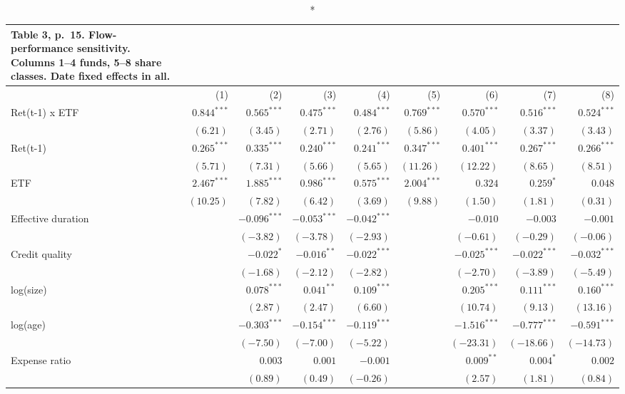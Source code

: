 \documentclass[10pt,a4paper]{article}
\begin{document}
{\scriptsize\setlength{\tabcolsep}{4pt}
\begin{longtable}{@{}l*{8}{r}@{}}
\caption*{\textbf{Table 3, p.~15. Flow-performance sensitivity. Columns 1--4 funds, 5--8 share classes. Date fixed effects in all.}}\\
\toprule
 & (1) & (2) & (3) & (4) & (5) & (6) & (7) & (8)\\
\midrule\endhead
Ret(t-1) x ETF & $0.844^{***}$ & $0.565^{***}$ & $0.475^{***}$ & $0.484^{***}$ & $0.769^{***}$ & $0.570^{***}$ & $0.516^{***}$ & $0.524^{***}$\\
 & $(6.21)$ & $(3.45)$ & $(2.71)$ & $(2.76)$ & $(5.86)$ & $(4.05)$ & $(3.37)$ & $(3.43)$\\
Ret(t-1) & $0.265^{***}$ & $0.335^{***}$ & $0.240^{***}$ & $0.241^{***}$ & $0.347^{***}$ & $0.401^{***}$ & $0.267^{***}$ & $0.266^{***}$\\
 & $(5.71)$ & $(7.31)$ & $(5.66)$ & $(5.65)$ & $(11.26)$ & $(12.22)$ & $(8.65)$ & $(8.51)$\\
ETF & $2.467^{***}$ & $1.885^{***}$ & $0.986^{***}$ & $0.575^{***}$ & $2.004^{***}$ & $0.324$ & $0.259^{*}$ & $0.048$\\
 & $(10.25)$ & $(7.82)$ & $(6.42)$ & $(3.69)$ & $(9.88)$ & $(1.50)$ & $(1.81)$ & $(0.31)$\\
Effective duration &  & $-0.096^{***}$ & $-0.053^{***}$ & $-0.042^{***}$ &  & $-0.010$ & $-0.003$ & $-0.001$\\
 &  & $(-3.82)$ & $(-3.78)$ & $(-2.93)$ &  & $(-0.61)$ & $(-0.29)$ & $(-0.06)$\\
Credit quality &  & $-0.022^{*}$ & $-0.016^{**}$ & $-0.022^{***}$ &  & $-0.025^{***}$ & $-0.022^{***}$ & $-0.032^{***}$\\
 &  & $(-1.68)$ & $(-2.12)$ & $(-2.82)$ &  & $(-2.70)$ & $(-3.89)$ & $(-5.49)$\\
log(size) &  & $0.078^{***}$ & $0.041^{**}$ & $0.109^{***}$ &  & $0.205^{***}$ & $0.111^{***}$ & $0.160^{***}$\\
 &  & $(2.87)$ & $(2.47)$ & $(6.60)$ &  & $(10.74)$ & $(9.13)$ & $(13.16)$\\
log(age) &  & $-0.303^{***}$ & $-0.154^{***}$ & $-0.119^{***}$ &  & $-1.516^{***}$ & $-0.777^{***}$ & $-0.591^{***}$\\
 &  & $(-7.50)$ & $(-7.00)$ & $(-5.22)$ &  & $(-23.31)$ & $(-18.66)$ & $(-14.73)$\\
Expense ratio &  & $0.003$ & $0.001$ & $-0.001$ &  & $0.009^{**}$ & $0.004^{*}$ & $0.002$\\
 &  & $(0.89)$ & $(0.49)$ & $(-0.26)$ &  & $(2.57)$ & $(1.81)$ & $(0.84)$\\

\end{longtable}}
\end{document}

